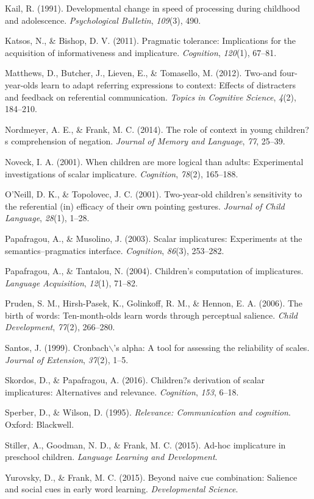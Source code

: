 \documentclass[a4paper,man,apacite,floatsintext]{apa6}
\begin{document}
Kail, R. (1991). Developmental change in speed of processing during
childhood and adolescence. \emph{Psychological Bulletin}, \emph{109}(3),
490.

Katsos, N., \& Bishop, D. V. (2011). Pragmatic tolerance: Implications
for the acquisition of informativeness and implicature.
\emph{Cognition}, \emph{120}(1), 67--81.

Matthews, D., Butcher, J., Lieven, E., \& Tomasello, M. (2012). Two-and
four-year-olds learn to adapt referring expressions to context: Effects
of distracters and feedback on referential communication. \emph{Topics
in Cognitive Science}, \emph{4}(2), 184--210.

Nordmeyer, A. E., \& Frank, M. C. (2014). The role of context in young
children?s comprehension of negation. \emph{Journal of Memory and
Language}, \emph{77}, 25--39.

Noveck, I. A. (2001). When children are more logical than adults:
Experimental investigations of scalar implicature. \emph{Cognition},
\emph{78}(2), 165--188.

O'Neill, D. K., \& Topolovec, J. C. (2001). Two-year-old children's
sensitivity to the referential (in) efficacy of their own pointing
gestures. \emph{Journal of Child Language}, \emph{28}(1), 1--28.

Papafragou, A., \& Musolino, J. (2003). Scalar implicatures: Experiments
at the semantics--pragmatics interface. \emph{Cognition}, \emph{86}(3),
253--282.

Papafragou, A., \& Tantalou, N. (2004). Children's computation of
implicatures. \emph{Language Acquisition}, \emph{12}(1), 71--82.

Pruden, S. M., Hirsh-Pasek, K., Golinkoff, R. M., \& Hennon, E. A.
(2006). The birth of words: Ten-month-olds learn words through
perceptual salience. \emph{Child Development}, \emph{77}(2), 266--280.

Santos, J. (1999). Cronbach\(\backslash\)'s alpha: A tool for assessing
the reliability of scales. \emph{Journal of Extension}, \emph{37}(2),
1--5.

Skordos, D., \& Papafragou, A. (2016). Children?s derivation of scalar
implicatures: Alternatives and relevance. \emph{Cognition}, \emph{153},
6--18.

Sperber, D., \& Wilson, D. (1995). \emph{Relevance: Communication and
cognition}. Oxford: Blackwell.

Stiller, A., Goodman, N. D., \& Frank, M. C. (2015). Ad-hoc implicature
in preschool children. \emph{Language Learning and Development}.

Yurovsky, D., \& Frank, M. C. (2015). Beyond naive cue combination:
Salience and social cues in early word learning. \emph{Developmental
Science}.


\end{document}
